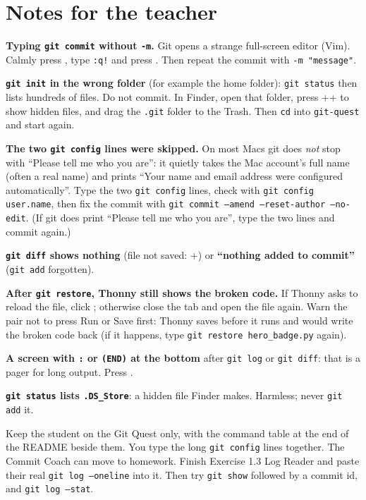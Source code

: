 \section{Notes for the teacher}
\begin{commonmistakes}
  \item \textbf{Typing \texttt{git commit} without \texttt{-m}.} Git opens a strange full-screen editor (Vim). Calmly press , type \texttt{:q!} and press . Then repeat the commit with \texttt{-m "message"}.
  \item \textbf{\texttt{git init} in the wrong folder} (for example the home folder): \texttt{git status} then lists hundreds of files. Do not commit. In Finder, open that folder, press ++ to show hidden files, and drag the \texttt{.git} folder to the Trash. Then \texttt{cd} into \texttt{git-quest} and start again.
  \item \textbf{The two \texttt{git config} lines were skipped.} On most Macs git does \emph{not} stop with \enquote{Please tell me who you are}: it quietly takes the Mac account's full name (often a real name) and prints \enquote{Your name and email address were configured automatically}. Type the two \texttt{git config} lines, check with \texttt{git config user.name}, then fix the commit with \texttt{git commit --amend --reset-author --no-edit}. (If git does print \enquote{Please tell me who you are}, type the two lines and commit again.)
  \item \textbf{\texttt{git diff} shows nothing} (file not saved: +) or \textbf{\enquote{nothing added to commit}} (\texttt{git add} forgotten).
  \item \textbf{After \texttt{git restore}, Thonny still shows the broken code.} If Thonny asks to reload the file, click ; otherwise close the tab and open the file again. Warn the pair not to press Run or Save first: Thonny saves before it runs and would write the broken code back (if it happens, type \texttt{git restore hero\_badge.py} again).
  \item \textbf{A screen with \texttt{:} or \texttt{(END)} at the bottom} after \texttt{git log} or \texttt{git diff}: that is a pager for long output. Press .
  \item \textbf{\texttt{git status} lists \texttt{.DS\_Store}}: a hidden file Finder makes. Harmless; never \texttt{git add} it.
\end{commonmistakes}

\begin{differentiation}
\supportpath Keep the student on the Git Quest only, with the command table at the end of the README beside them. You type the long \texttt{git config} lines together. The Commit Coach can move to homework.
\extensionpath Finish Exercise 1.3 Log Reader and paste their real \texttt{git log --oneline} into it. Then try \texttt{git show} followed by a commit id, and \texttt{git log --stat}.
\end{differentiation}

